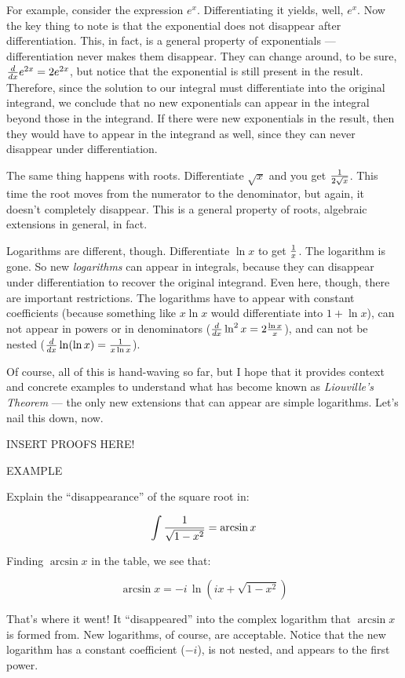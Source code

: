 For example, consider the expression $e^x$.  Differentiating it
yields, well, $e^x$.  Now the key thing to note is that the
exponential does not disappear after differentiation.  This, in fact,
is a general property of exponentials --- differentiation never makes
them disappear.  They can change around, to be sure,
${d\over dx}e^{2x}=2e^{2x}$, but notice that the exponential is still
present in the result.  Therefore, since the solution to our integral
must differentiate into the original integrand, we conclude that no
new exponentials can appear in the integral beyond those in the
integrand.  If there were new exponentials in the result, then they
would have to appear in the integrand as well, since they can never
disappear under differentiation.

The same thing happens with roots.  Differentiate $\sqrt{x}$ and you
get ${1\over{2\sqrt{x}}}$.  This time the root moves from the
numerator to the denominator, but again, it doesn't completely
disappear.  This is a general property of roots, algebraic extensions
in general, in fact.

Logarithms are different, though.  Differentiate $\ln x$ to get
$1\over x$.  The logarithm is gone.  So new {\it logarithms} can
appear in integrals, because they can disappear under differentiation
to recover the original integrand.  Even here, though, there are
important restrictions.  The logarithms have to appear with constant
coefficients (because something like $x\ln x$ would differentiate into
$1 + \ln x$), can not appear in powers or in denominators (${d\over
dx} \ln^2x = 2{\ln x\over x}$), and can not be nested (${d\over dx}
\ln(\ln x) = {1\over{x\ln x}}$).

Of course, all of this is hand-waving so far, but I hope that it
provides context and concrete examples to understand what has become
known as {\it Liouville's Theorem} --- the only new extensions that
can appear are simple logarithms.  Let's nail this down, now.

INSERT PROOFS HERE!

EXAMPLE

Explain the ``disappearance'' of the square root in:

$$\int{1\over\sqrt{1-x^2}} = \arcsin x$$

Finding $\arcsin x$ in the table, we see that:

$$\arcsin x = -i \,\ln (ix + \sqrt{1-x^2})$$

That's where it went!  It ``disappeared'' into the complex logarithm
that $\arcsin x$ is formed from.  New logarithms, of course, are
acceptable.  Notice that the new logarithm has a constant coefficient
($-i$), is not nested, and appears to the first power.
